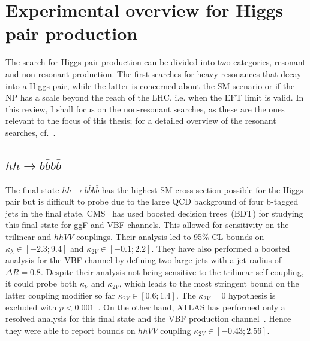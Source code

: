 \section{Experimental overview for Higgs pair production \label{exphh}  }
The search for Higgs pair production can be divided into two categories, resonant and non-resonant production. The first searches for heavy resonances that decay into a Higgs pair, while the latter is concerned about the SM scenario or if the NP has a scale beyond the reach of the LHC, i.e. when the EFT limit is valid. In this review, I shall focus on the non-resonant searches, as these are the ones relevant to the focus of this thesis; for a detailed overview of the resonant searches, cf.~\cite{DiMicco:2019ngk}.\\
%
\subsection*{$hh \to b\bar b b \bar b $}
The final state $ hh \to b\bar b b \bar b$ has the highest SM cross-section possible for the Higgs pair but is difficult to probe due to the large QCD background of four b-tagged jets in the final state. CMS~\cite{CMS-PAS-HIG-20-005} has used boosted decision trees~(BDT) for studying this final state for ggF and VBF channels. This allowed for sensitivity on the trilinear and $hhVV$ couplings. Their analysis led to 95\% CL bounds on $\kappa_\lambda \in [-2.3;9.4]$ and $\kappa_{2V} \in [-0.1; 2.2]$.  They have also performed a boosted analysis for the VBF channel by defining two large jets with a jet radius of $\Delta R =0.8$. Despite their analysis not being sensitive to the trilinear self-coupling, it could probe both $\kappa_V$ and  $\kappa_{2V} $, which leads to the most stringent bound on the latter coupling modifier so far  $\kappa_{2V}  \in [0.6;1.4]$. The $\kappa_{2V}=0$ hypothesis is excluded with $ p<0.001$~\cite{CMS-PAS-B2G-21-001}. On the other hand, ATLAS has performed only a resolved analysis for this final state and the VBF production channel~\cite{ATLAS:2020jgy}. Hence they were able to report bounds on $hhVV$ coupling $\kappa_{2V} \in [-0.43;2.56]$. 
